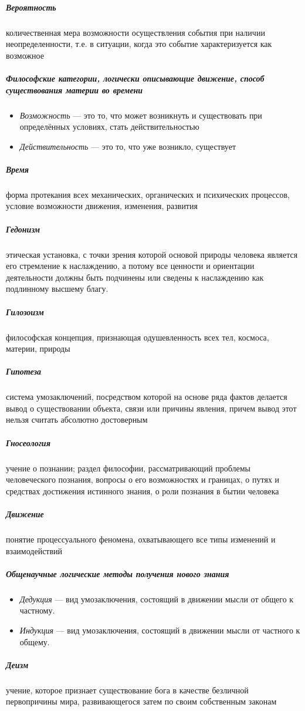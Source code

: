 \documentclass[a4paper, 12pt]{article}
\theoremstyle{plain} %
\theoremstyle{definition} %
\theoremstyle{remark} %
\begin{document}
\subparagraph{Вероятность}
    количественная мера возможности осуществления события при наличии неопределенности, т.е. в ситуации, когда это событие характеризуется как возможное

\subparagraph{Философские категории, логически описывающие движение, способ существования материи во времени}
\begin{itemize}
	\item[] \emph{Возможность} --- это то, что может возникнуть и существовать при определённых условиях, стать действительностью
	\item[] \emph{Действительность} --- это то, что уже возникло, существует
\end{itemize}

\subparagraph{Время}
    форма протекания всех механических, органических и психических процессов, условие возможности движения, изменения, развития

\subparagraph{Гедонизм}
    этическая установка, с точки зрения которой основой природы человека является его стремление к наслаждению, а потому все ценности и ориентации деятельности должны быть подчинены или сведены к наслаждению как подлинному высшему благу.

\subparagraph{Гилозоизм}
    философская концепция, признающая одушевленность всех тел, космоса, материи, природы

\subparagraph{Гипотеза}
    система умозаключений, посредством которой на основе ряда фактов делается вывод о существовании объекта, связи или причины явления, причем вывод этот нельзя считать абсолютно достоверным

\subparagraph{Гносеология}
    учение о познании; раздел философии, рассматривающий проблемы человеческого познания, вопросы о его возможностях и границах, о путях и средствах достижения истинного знания, о роли познания в бытии человека

\subparagraph{Движение}
	понятие процессуального феномена, охватывающего все типы изменений и взаимодействий

\subparagraph{Общенаучные логические методы получения нового знания}
\begin{itemize}
	\item[] \emph{Дедукция} --- вид умозаключения, состоящий в движении мысли от общего к частному.
	\item[] \emph{Индукция} --- вид умозаключения, состоящий в движении мысли от частного к общему.
\end{itemize}

\subparagraph{Деизм}
	учение, которое признает существование бога в качестве безличной первопричины мира, развивающегося затем по своим собственным законам
\end{document}
